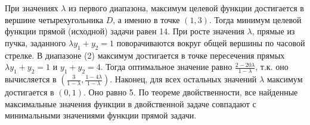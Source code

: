 \begin{problem}
\begin{sol}
При значениях $\lambda $ из первого диапазона, максимум целевой функции достигается в вершине четырехугольника $D$, а именно в точке $(1,3)$. Тогда минимум целевой функции прямой (исходной) задачи равен 14. При росте значения $\lambda $, прямые из пучка, заданного $\lambda y_{1} +y_{2} =1$ поворачиваются вокруг общей вершины по часовой стрелке. В диапазоне (2) максимум достигается в точке пересечения прямых $\lambda y_{1} +y_{2} =1$ и $y_{1} +y_{2} =4$. Тогда оптимальное значение  равно $\frac{2-20\lambda }{1-\lambda } $, т.к. оно вычисляется в $(\frac{3}{1-\lambda } ,  \frac{1-4\lambda }{1-\lambda } )$. Наконец, для всех остальных значений $\lambda $ максимум достигается в $(0,1).$ Оно равно 5. По теореме двойственности, все найденные максимальные значения функции в двойственной задаче совпадают с минимальными значениями функции прямой задачи.
\end{sol}
\end{problem}

